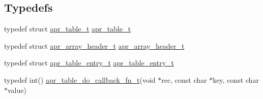 \subsection*{Typedefs}
\begin{DoxyCompactItemize}
\item 
typedef struct \mbox{\hyperlink{group__apr__tables_gad7ea82d6608a4a633fc3775694ab71e4}{apr\+\_\+table\+\_\+t}} \mbox{\hyperlink{group__apr__tables_gad7ea82d6608a4a633fc3775694ab71e4}{apr\+\_\+table\+\_\+t}}
\item 
typedef struct \mbox{\hyperlink{structapr__array__header__t}{apr\+\_\+array\+\_\+header\+\_\+t}} \mbox{\hyperlink{group__apr__tables_ga63e76617a1cd3828bbaefcbf93928ec2}{apr\+\_\+array\+\_\+header\+\_\+t}}
\item 
typedef struct \mbox{\hyperlink{structapr__table__entry__t}{apr\+\_\+table\+\_\+entry\+\_\+t}} \mbox{\hyperlink{group__apr__tables_gac7e0151b714e58b75c597dafed75df3f}{apr\+\_\+table\+\_\+entry\+\_\+t}}
\item 
typedef int() \mbox{\hyperlink{group__apr__tables_ga633325e16f9e1f81adce476fb71cbd88}{apr\+\_\+table\+\_\+do\+\_\+callback\+\_\+fn\+\_\+t}}(void $\ast$rec, const char $\ast$key, const char $\ast$value)
\end{DoxyCompactItemize}
